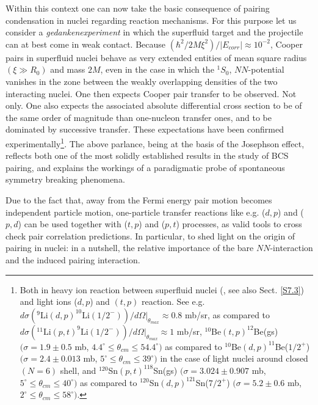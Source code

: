 Within this context one can now take the basic consequence of pairing condensation in nuclei regarding reaction mechanisms. For this purpose let us consider a \textit{gedankenexperiment} in which the superfluid target and the projectile can at best come in  weak contact.  Because $\left(\hbar^2/2M\xi^2\right)/|E_{corr}|\approx10^{-2}$, Cooper pairs in superfluid nuclei behave as very extended entities of mean square radius $(\xi\gg R_0)$ and mass $2M$,  even in the case in which the $^1S_0$, $NN$-potential vanishes in the zone between the weakly overlapping densities of the two interacting nuclei. One then expects Cooper pair transfer to be observed. Not only. One also expects  the associated absolute differential cross section to be of the same order of magnitude than one-nucleon transfer ones, and to be dominated by successive transfer. These expectations have been confirmed experimentally\footnote{\label{f28} Both in heavy ion reaction between superfluid nuclei (\cite{Montanari:14}, see also Sect. \ref{S7.3}) and light ions ($d,p$) and $(t,p)$ reaction. See e.g. \cite{Cavallaro:17} $d\sigma(^9\text{Li} (d,p)^{10}\text{Li} (1/2^-))/d\Omega|_{\theta_{max}}\approx0.8$ mb/sr, as compared to \cite{Tanihata:08}  $d\sigma(^{11}\text{Li} (p,t)^{9}\text{Li} (1/2^-))/d\Omega|_{\theta_{max}}\approx1 $ mb/sr, \cite{Fortune:94} $^{10}$Be$(t,p)^{12}$Be(gs) $(\sigma=1.9\pm0.5$ mb, $4.4^\circ\leq\theta_{cm}\leq54.4^\circ)$ as compared to \cite{Schmitt:13} 
 	$^{10}$Be$(d,p)^{11}$Be($1/2^+$) $(\sigma=2.4\pm0.013$ mb, $5^\circ\leq\theta_{cm}\leq39^\circ)$ in the case of light nuclei around closed $(N=6)$ shell, and \cite{Bassani:65} $^{120}$Sn$(p,t)^{118}$Sn(gs) $(\sigma=3.024\pm0.907$ mb, $5^\circ\leq\theta_{cm}\leq40^\circ)$ as compared to \cite{Bechara:75} $^{120}$Sn$(d,p)^{121}$Sn($7/2^+$) $(\sigma=5.2\pm0.6$ mb, $2^\circ\leq\theta_{cm}\leq58^\circ)$.}.
 The above parlance, being at the basis of the Josephson effect, reflects both one of the most solidly established results in the study of BCS pairing, and explains the workings of a paradigmatic probe of spontaneous symmetry breaking phenomena.
 
 
 
Due to the fact that, away from the Fermi energy pair  motion becomes independent particle motion, one-particle transfer reactions like e.g. ($d,p$) and ($p,d$) can be used together with ($t,p$) and ($p,t$) processes, as  valid tools to cross check pair correlation predictions. In particular, to shed light on the origin of pairing in nuclei: in a nutshell, the relative importance of the bare $NN$-interaction and the induced pairing interaction.

